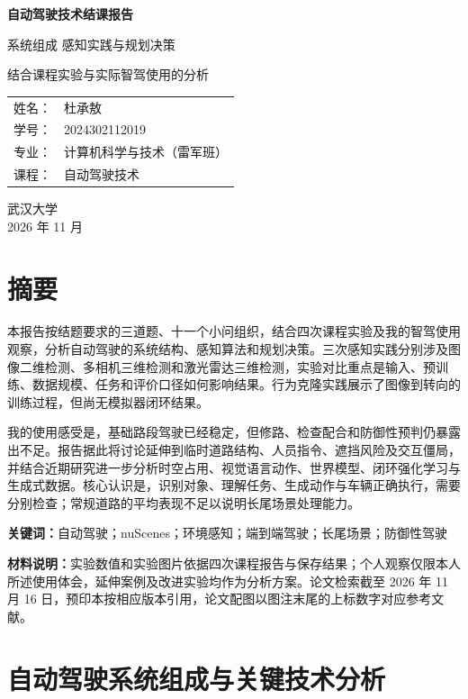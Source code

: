 \documentclass[UTF8,zihao=-4,fontset=windows]{ctexart}
\begin{document}
\begin{titlepage}\centering\vspace*{1.8cm}
{\heiti\bfseries 自动驾驶技术结课报告\par}\vspace{1.0cm}
{\heiti 系统组成 感知实践与规划决策\par}\vspace{.4cm}
{结合课程实验与实际智驾使用的分析\par}\vfill
{\begin{tabular}{rl}姓名：&杜承敖\\[.6em]学号：&2024302112019\\[.6em]专业：&计算机科学与技术（雷军班）\\[.6em]课程：&自动驾驶技术\end{tabular}\par}\vfill
{武汉大学\\[.4em]2026 年 11 月\par}\end{titlepage}
\tableofcontents\clearpage{}
\section*{摘要}
本报告按结题要求的三道题、十一个小问组织，结合四次课程实验及我的智驾使用观察，分析自动驾驶的系统结构、感知算法和规划决策。三次感知实践分别涉及图像二维检测、多相机三维检测和激光雷达三维检测，实验对比重点是输入、预训练、数据规模、任务和评价口径如何影响结果。行为克隆实践展示了图像到转向的训练过程，但尚无模拟器闭环结果。

我的使用感受是，基础路段驾驶已经稳定，但修路、检查配合和防御性预判仍暴露出不足。报告据此将讨论延伸到临时道路结构、人员指令、遮挡风险及交互僵局，并结合近期研究进一步分析时空占用、视觉语言动作、世界模型、闭环强化学习与生成式数据。核心认识是，识别对象、理解任务、生成动作与车辆正确执行，需要分别检查；常规道路的平均表现不足以说明长尾场景处理能力。

\noindent\textbf{关键词：}自动驾驶；nuScenes；环境感知；端到端驾驶；长尾场景；防御性驾驶

\noindent\textbf{材料说明：}实验数值和实验图片依据四次课程报告与保存结果；个人观察仅限本人所述使用体会，延伸案例及改进实验均作为分析方案。论文检索截至 2026 年 11 月 16 日，预印本按相应版本引用，论文配图以图注末尾的上标数字对应参考文献。
\section{自动驾驶系统组成与关键技术分析}
\FloatBarrier
\end{document}
